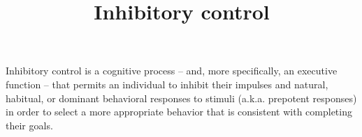 \documentclass[a4paper]{article}
\title{Inhibitory control}
\date{}
\begin{document}
    \maketitle
    Inhibitory control is a cognitive process – and, more specifically, an executive function – that permits an individual to inhibit their impulses and natural, habitual, or dominant behavioral responses to stimuli (a.k.a. prepotent responses) in order to select a more appropriate behavior that is consistent with completing their goals. 
\end{document}
